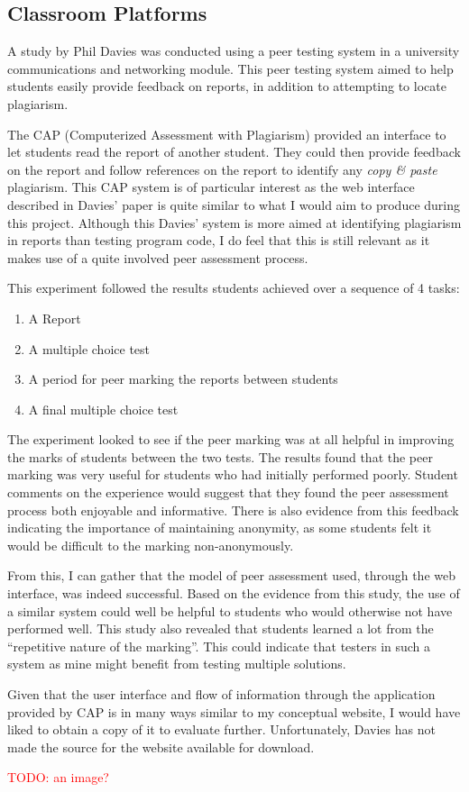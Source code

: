 \documentclass[a4paper,11pt]{report}
\newcommand{\todo}[1]{\textcolor{red}{TODO: #1}}
\begin{document}
\subsection{Classroom Platforms}
A study by Phil Davies\cite{davies_computerized_2000} was conducted using a peer testing system in a university communications and networking module. This peer testing system aimed to help students easily provide feedback on reports, in addition to attempting to locate plagiarism.\par
The CAP (Computerized Assessment with Plagiarism) provided an interface to let students read the report of another student. They could then provide feedback on the report and follow references on the report to identify any \textit{copy \& paste} plagiarism. This CAP system is of particular interest as the web interface described in Davies' paper is quite similar to what I would aim to produce during this project. Although this Davies' system is more aimed at identifying plagiarism in reports than testing program code, I do feel that this is still relevant as it makes use of a quite involved peer assessment process.\par
This experiment followed the results students achieved over a sequence of 4 tasks:
\begin{enumerate}
\item A Report
\item A multiple choice test
\item A period for peer marking the reports between students
\item A final multiple choice test
\end{enumerate}
The experiment looked to see if the peer marking was at all helpful in improving the marks of students between the two tests. The results found that the peer marking was very useful for students who had initially performed poorly. Student comments on the experience would suggest that they found the peer assessment process both enjoyable and informative. There is also evidence from this feedback indicating the importance of maintaining anonymity, as some students felt it would be difficult to the marking non-anonymously.\par
From this, I can gather that the model of peer assessment used, through the web interface, was indeed successful. Based on the evidence from this study, the use of a similar system could well be helpful to students who would otherwise not have performed well. This study also revealed that students learned a lot from the ``repetitive nature of the marking''. This could indicate that testers in such a system as mine might benefit from testing multiple solutions.\par
Given that the user interface and flow of information through the application provided by CAP is in many ways similar to my conceptual website, I would have liked to obtain a copy of it to evaluate further. Unfortunately, Davies has not made the source for the website available for download.\par
\todo{an image?}
\end{document}
